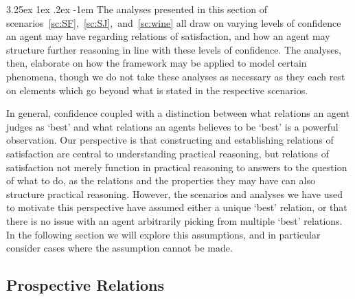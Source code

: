 \documentclass[10pt]{article}
\makeatletter
\renewcommand\paragraph{\@startsection{paragraph}{5}{\z@}%
  {3.25ex \@plus1ex \@minus.2ex}%
  {-1em}%
  {\normalfont\normalsize\bfseries}}
\makeatother
\begin{document}
\paragraph{ } %
The analyses presented in this section of scenarios~\ref{sc:SF},~\ref{sc:SJ},~and~\ref{sc:wine} all draw on varying levels of confidence an agent may have regarding relations of satisfaction, and how an agent may structure further reasoning in line with these levels of confidence.
The analyses, then, elaborate on how the framework may be applied to model certain phenomena, though we do not take these analyses as necessary as they each rest on elements which go beyond what is stated in the respective scenarios.

In general, confidence coupled with a distinction between what relations an agent judges as `best' and what relations an agents believes to be `best' is a powerful observation.
Our perspective is that constructing and establishing relations of satisfaction are central to understanding practical reasoning, but relations of satisfaction not merely function in practical reasoning to answers to the question of what to do, as the relations and the properties they may have can also structure practical reasoning.
However, the scenarios and analyses we have used to motivate this perspective have assumed either a unique `best' relation, or that there is no issue with an agent arbitrarily picking from multiple `best' relations.
In the following section we will explore this assumptions, and in particular consider cases where the assumption cannot be made.

\subsection{Prospective Relations}
\label{sec:prosp-relat}


\end{document}
